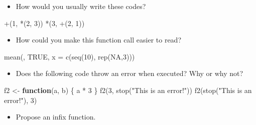 \documentclass[
]{article}
\newenvironment{Shaded}{}{}
\newcommand{\AttributeTok}[1]{#1}
\newcommand{\ConstantTok}[1]{#1}
\newcommand{\ControlFlowTok}[1]{\textbf{#1}}
\newcommand{\DecValTok}[1]{#1}
\newcommand{\FunctionTok}[1]{#1}
\newcommand{\NormalTok}[1]{#1}
\newcommand{\OtherTok}[1]{#1}
\newcommand{\SpecialCharTok}[1]{#1}
\newcommand{\StringTok}[1]{#1}
\providecommand{\tightlist}{%
  \setlength{\itemsep}{0pt}\setlength{\parskip}{0pt}}
\begin{document}
\begin{itemize}
\tightlist
\item
  How would you usually write these codes?
\end{itemize}

\begin{Shaded}
\begin{Highlighting}[]
\StringTok{\textasciigrave{}}\AttributeTok{+}\StringTok{\textasciigrave{}}\NormalTok{(}\DecValTok{1}\NormalTok{, }\StringTok{\textasciigrave{}}\AttributeTok{*}\StringTok{\textasciigrave{}}\NormalTok{(}\DecValTok{2}\NormalTok{, }\DecValTok{3}\NormalTok{))}
\StringTok{\textasciigrave{}}\AttributeTok{*}\StringTok{\textasciigrave{}}\NormalTok{(}\DecValTok{3}\NormalTok{, }\StringTok{\textasciigrave{}}\AttributeTok{+}\StringTok{\textasciigrave{}}\NormalTok{(}\DecValTok{2}\NormalTok{, }\DecValTok{1}\NormalTok{))}
\end{Highlighting}
\end{Shaded}

\begin{itemize}
\tightlist
\item
  How could you make this function call easier to read?
\end{itemize}

\begin{Shaded}
\begin{Highlighting}[]
\FunctionTok{mean}\NormalTok{(, }\ConstantTok{TRUE}\NormalTok{, }\AttributeTok{x =} \FunctionTok{c}\NormalTok{(}\FunctionTok{seq}\NormalTok{(}\DecValTok{10}\NormalTok{), }\FunctionTok{rep}\NormalTok{(}\ConstantTok{NA}\NormalTok{,}\DecValTok{3}\NormalTok{)))}
\end{Highlighting}
\end{Shaded}

\begin{itemize}
\tightlist
\item
  Does the following code throw an error when executed? Why or why not?
\end{itemize}

\begin{Shaded}
\begin{Highlighting}[]
\NormalTok{f2 }\OtherTok{\textless{}{-}} \ControlFlowTok{function}\NormalTok{(a, b) \{}
\NormalTok{  a }\SpecialCharTok{*} \DecValTok{3}
\NormalTok{\}}
\FunctionTok{f2}\NormalTok{(}\DecValTok{3}\NormalTok{, }\FunctionTok{stop}\NormalTok{(}\StringTok{"This is an error!"}\NormalTok{))}
\FunctionTok{f2}\NormalTok{(}\FunctionTok{stop}\NormalTok{(}\StringTok{"This is an error!"}\NormalTok{), }\DecValTok{3}\NormalTok{)}
\end{Highlighting}
\end{Shaded}

\begin{itemize}
\tightlist
\item
  Propose an infix function.
\end{itemize}
\end{document}
